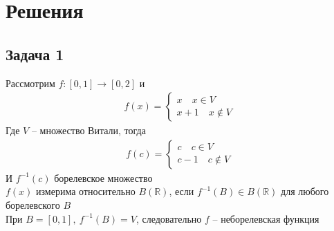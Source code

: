 
\newpage
\section*{Решения}
\subsection*{Задача 1}
	Рассмотрим $f: [0,1] \to [0,2]$ и 
	\begin{gather*}
		f(x) =
		\begin{cases}
			x\quad x \in V\\
			x+1\quad x \notin V
		\end{cases}
	\end{gather*}
	Где $V$ -- множество Витали, тогда
	\begin{gather*}
		f(c) =
		\begin{cases}
			c\quad c \in V\\
			c-1\quad c \notin V
		\end{cases}
	\end{gather*}
	И $f^{-1}(c)$ борелевское множество\\
	$f(x)$ измерима относительно $B(\mathbb{R})$, если $f^{-1}(B) \in B(\mathbb{R})$ для любого борелевского $B$\\
	При $B = [0,1],\ f^{-1}(B) = V$, следовательно $f$ -- неборелевская функция
	\vskip0.5in


